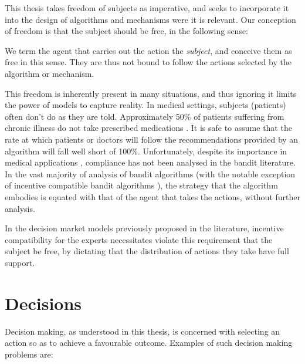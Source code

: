 This thesis takes freedom of subjects as imperative, and seeks to incorporate it into the design of algorithms and mechanisms were it is relevant.
Our conception of freedom is that the subject should be free, in the following sense:



We term the agent that carries out the action the \emph{subject}, and conceive them as free in this sense. They are thus not bound to follow the actions selected by the algorithm or mechanism. 

This freedom is inherently present in many situations, and thus ignoring it limits the power of models to capture reality. 
In medical settings, subjects (patients) often don't do as they are told. Approximately 50\% of patients suffering from chronic illness do not take prescribed medications \cite{sabate:03}. It is safe to assume that the rate at which patients or doctors will follow the recommendations provided by an algorithm will fall well short of 100\%. 
Unfortunately, despite its importance in medical applications \cite{vrijens:12,hugtenburg:13}, compliance has not been analysed in the bandit literature. 
In the vast majority of analysis of bandit algorithms (with the notable exception of incentive compatible bandit algorithms \cite{kremer2014implementing,mansour2015bayesian}), the strategy that the algorithm embodies is equated with that of the agent that takes the actions, without further analysis.

In the decision market models previously proposed in the literature, incentive compatibility for the experts necessitates \cite{othman2010decision,chen2014eliciting} violate this requirement that the subject be free, by dictating that the distribution of actions they take have full support.


\section{Decisions}

Decision making, as understood in this thesis, is concerned with selecting an action so as to achieve a favourable outcome. 
Examples of such decision making problems are:

